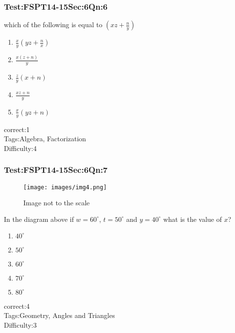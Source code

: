 \documentclass[]{beamer}
\begin{document}
    \begin{frame}
	    \frametitle{Test:FSPT14-15\hspace{2mm}Sec:6\hspace{2mm}Qn:6}
	which of the following is equal to $\left(xz+\frac{n}{y}\right)$       
	    \begin{enumerate}
	        \item
	           $\frac{x}{y}\left(yz+\frac{n}{x}\right)$ 
	        \item
	           $\frac{x(z+n)}{y}$
	        \item
	           $\frac{z}{y}\left(x+n\right)$
	        \item
	            $\frac{xz+n}{y}$
	        \item
	            $\frac{x}{y}\left(yz+n\right)$
	    \end{enumerate}
	    correct:1  \\   
	    Tags:Algebra, Factorization    \\
	    Difficulty:4   \\
    \end{frame}
    \begin{frame}
	    \frametitle{Test:FSPT14-15\hspace{2mm}Sec:6\hspace{2mm}Qn:7}
	    \begin{figure}
	    \begin{center}
	    \texttt{[image: images/img4.png]}
	    \end{center}
	    {Image not to the scale}
	    \end{figure}
	    In the diagram above if $w=60^\circ$, $t=50^\circ$ and $y=40^\circ$ what is the value of $x$? 
	    \begin{enumerate}
	        \item
	            $40^\circ$
	        \item
	           $50^\circ$
	        \item
	           $60^\circ$
	        \item
	            $70^\circ$
	        \item
	            $80^\circ$
	    \end{enumerate}
	    correct:4  \\   
	    Tags:Geometry, Angles and Triangles    \\
	    Difficulty:3   \\
    \end{frame}
\end{document}
